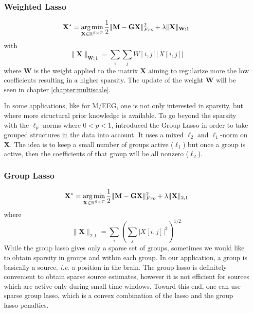 \subsubsection*{Weighted Lasso}
\begin{equation} \label{eq_wlasso}
	\mathbf{X}^\star = \mathop{\mathrm{arg}\,\mathrm{min}}_{\mathbf{X}\in\mathbb{R}^{S\times T}}\frac{1}{2}\|\mathbf{M}-\mathbf{GX}\|_{Fro}^2 + \lambda\|\mathbf{X}\|_{\mathbf{W};1}
\end{equation}
with
\begin{equation*}
	\|\mathbf{X}\|_{\mathbf{W};1}=\sum_i\sum_j W[i,j]|X[i,j]|
\end{equation*}
where $\mathbf{W}$ is the weight applied to the matrix $\mathbf{X}$ aiming to regularize more the low coefficients resulting in a higher sparsity. The update of the weight $\mathbf{W}$ will be seen in chapter \ref{chapter:multiscale}.
\endadjustwidth

In some applications, like for M/EEG, one is not only interested in sparsity, but where more structural prior knowledge is available. To go beyond the sparsity with the $\ell_p$-norms where $0<p<1$, \cite{yuan2006model} introduced the Group Lasso in order to take grouped structures  in the data into account. It uses a mixed $\ell_2$ and $\ell_1$-norm on $\mathbf{X}$. The idea is to keep a small number of groups active ($\ell_1$) but once a group is active, then the coefficients of that group will be all nonzero ($\ell_2$).
\adjustwidth{1em}{0pt}
\vspace{-10pt}
\subsubsection*{Group Lasso}
\vspace{-10pt}
\begin{equation} \label{eq_glasso}
	\mathbf{X}^\star = \mathop{\mathrm{arg}\,\mathrm{min}}_{\mathbf{X}\in\mathbb{R}^{S\times T}}\frac{1}{2}\|\mathbf{M}-\mathbf{GX}\|_{Fro}^2 + \lambda\|\mathbf{X}\|_{2,1}
\end{equation}
where
\begin{equation*}	\|\mathbf{X}\|_{2,1}=\sum_i\left(\sum_j|X[i,j]|^2\right)^{1/2}
\end{equation*}
\endadjustwidth
While the group lasso gives only a sparse set of groups, sometimes we would like to obtain sparsity in groups and within each group. In our application, a group is basically a source, \textit{i.e.} a position in the brain. The group lasso is definitely convenient to obtain sparse source estimates, however it is not efficient for sources which are active only during small time windows. Toward this end, one can use sparse group lasso, which is a convex combination of the lasso and the group lasso penalties.
\adjustwidth{1em}{0pt}

